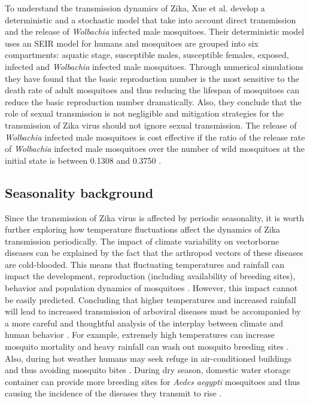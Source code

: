 \documentclass{ws-rv9x6}
\begin{document}
To understand the transmission dynamics of Zika, Xue et al. \cite{xue2021releasing} develop a deterministic and a stochastic model that take into account direct transmission and the release of \textit{Wolbachia} infected male mosquitoes. Their deterministic model uses an SEIR model for humans and mosquitoes are grouped into six compartments: aquatic stage, susceptible males, susceptible females, exposed, infected and \textit{Wolbachia} infected male mosquitoes. Through numerical simulations they have found that the basic reproduction number is the most sensitive to the death rate of adult mosquitoes and thus reducing the lifespan of mosquitoes can reduce the basic reproduction number dramatically. Also, they conclude that the role of sexual transmission is not negligible and mitigation strategies for the transmission of Zika virus should not ignore sexual transmission. The release of \textit{Wolbachia} infected male mosquitoes is cost effective if the ratio of the release rate of \textit{Wolbachia} infected male mosquitoes over the number of wild mosquitoes at the initial state is between 0.1308 and 0.3750 \cite{xue2021releasing}. 

\subsection{Seasonality background}
Since the transmission of Zika virus is affected by periodic seasonality, it is worth further exploring how temperature fluctuations affect the dynamics of Zika transmission periodically. 
The impact of climate variability on vectorborne diseases can be explained by the fact that the arthropod vectors of these diseases are cold-blooded. This means that  fluctuating temperatures and rainfall can impact the development, reproduction (including availability of breeding sites), behavior and population dynamics of mosquitoes \cite{gage2008climate}.
However, this impact cannot be easily predicted.  Concluding that higher temperatures and increased rainfall will lead to increased transmission of arboviral diseases must be accompanied by a more careful and thoughtful analysis of the interplay between climate and human behavior \cite{sutherst2004global}. For example, extremely high temperatures can increase mosquito mortality \cite{reeves1994potential} and 
heavy rainfall can wash out mosquito breeding sites \cite{reiter2001climate}. Also, during hot weather humans may seek refuge in air-conditioned buildings and thus avoiding mosquito bites \cite{reiter2003texas}. During dry season, domestic water storage container can provide more breeding sites for \textit{Aedes aegypti} mosquitoes and thus causing the incidence of the diseases they transmit to rise \cite{chretien2007drought}. 
\end{document}
